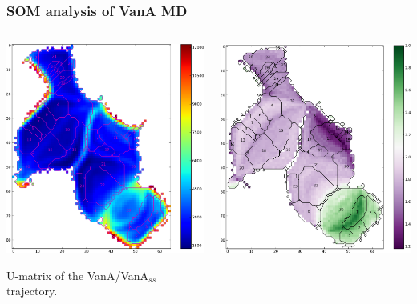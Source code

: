 \begin{frame}
    \frametitle{SOM analysis of VanA MD}
    \begin{columns}
        \begin{column}{.5\textwidth}
            \includegraphics[width=\textwidth]{figures/umat_VanA.png}

            U-matrix of the VanA/VanA$_{ss}$ trajectory.
        \end{column}
        \begin{column}{.5\textwidth}
            \includegraphics[width=\textwidth]{figures/rmsdmap_VanA.png}


\end{column}
\end{columns}
\end{frame}
